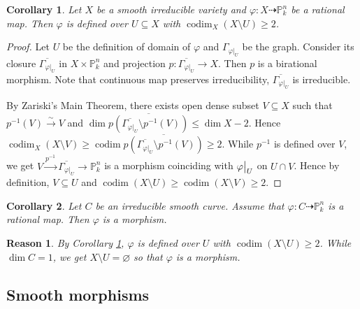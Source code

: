 \documentclass{ctexart}
\newtheorem{reason}{Reason}[section]
\newtheorem{corollary}{Corollary}[section]
\newcommand{\codim}{\operatorname{codim}}
\begin{document}
\begin{corollary}
    Let $X$ be a smooth irreducible variety and $\varphi: X \dashrightarrow \mathbb{P}_{k}^{n}$ be a rational map.
    Then $\varphi$ is defined over $U \subseteq X$ with $\codim_{X} (X \setminus U) \ge 2$.
    \label{Corollary 5.4}
\end{corollary}
\begin{proof}
    Let $U$ be the definition of domain of $\varphi$ and $\Gamma_{\varphi|_{U}}$ be the graph.
    Consider its closure $\overline{\Gamma_{\varphi|_{U}}}$ in $X \times \mathbb{P}_{k}^{n}$ and projection $p: \overline{\Gamma_{\varphi|_{U}}} \rightarrow X$.
    Then $p$ is a birational morphism.
    Note that continuous map preserves irreducibility, $\overline{\Gamma_{\varphi|_{U}}}$ is irreducible.
    \par
    By Zariski's Main Theorem, there exists open dense subset $V \subseteq X$ such that $p^{-1}(V) \overset{\sim}{\rightarrow} V$ and $\dim \overline{p(\overline{\Gamma_{\varphi|_{U}}} \setminus p^{-1}(V))} \le \dim X - 2$.
    Hence $\codim_{X} (X \setminus V) \ge \codim \overline{p(\overline{\Gamma_{\varphi|_{U}}} \setminus p^{-1}(V))} \ge 2$.
    While $p^{-1}$ is defined over $V$, we get $V \overset{p^{-1}}{\rightarrow} \overline{\Gamma_{\varphi|_{U}}} \rightarrow \mathbb{P}_{k}^{n}$ is a morphism coinciding with $\varphi\big{|}_{U}$ on $U \cap V$.
    Hence by definition, $V \subseteq U$ and $\codim (X \setminus U) \ge \codim (X \setminus V) \ge 2$.
\end{proof}
\begin{corollary}
    Let $C$ be an irreducible smooth curve.
    Assume that $\varphi: C \dashrightarrow \mathbb{P}_{k}^{n}$ is a rational map.
    Then $\varphi$ is a morphism.
    \label{Corollary 5.5}
\end{corollary}
\begin{reason}
    By Corollary \ref{Corollary 5.4}, $\varphi$ is defined over $U$ with $\codim (X \setminus U) \ge 2$.
    While $\dim C = 1$, we get $X \setminus U = \varnothing$ so that $\varphi$ is a morphism. 
\end{reason}

\subsection{Smooth morphisms}
\label{subsection:Smooth_Points_and_Smooth_Morphisms_Smooth_morphisms}
\end{document}
